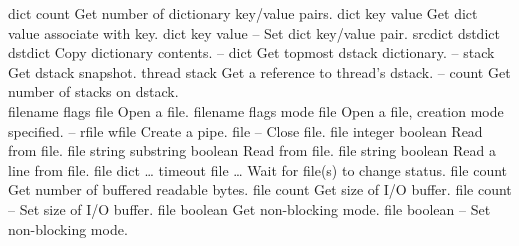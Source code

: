 \begin{longtable}{}
\hline
\optableent
	{dict}
	{{\bf {}}}
	{count}
	{Get number of dictionary key/value pairs.}
\hline
\optableent
	{dict key}
	{{\bf {}}}
	{value}
	{Get dict value associate with key.}
\hline
\optableent
	{dict key value}
	{{\bf {}}}
	{--}
	{Set dict key/value pair.}
\hline
\optableent
	{srcdict dstdict}
	{{\bf {}}}
	{dstdict}
	{Copy dictionary contents.}
\hline
\optableent
	{--}
	{{\bf {}}}
	{dict}
	{Get topmost dstack dictionary.}
\hline
\optableent
	{--}
	{{\bf {}}}
	{stack}
	{Get dstack snapshot.}
\hline
\optableent
	{thread}
	{{\bf {}}}
	{stack}
	{Get a reference to thread's dstack.}
\hline
\optableent
	{--}
	{{\bf {}}}
	{count}
	{Get number of stacks on dstack.}
\hline \hline
{} \\
\hline \hline
\optableent
	{filename flags}
	{{\bf {}}}
	{file}
	{Open a file.}
\optableent
	{filename flags mode}
	{{\bf {}}}
	{file}
	{Open a file, creation mode specified.}
\hline
\optableent
	{--}
	{{\bf {}}}
	{rfile wfile}
	{Create a pipe.}
\hline
\optableent
	{file}
	{{\bf {}}}
	{--}
	{Close file.}
\hline
\optableent
	{file}
	{{\bf {}}}
	{integer boolean}
	{Read from file.}
\optableent
	{file string}
	{{\bf {}}}
	{substring boolean}
	{Read from file.}
\optableent
	{file}
	{{\bf {}}}
	{string boolean}
	{Read a line from file.}
\hline
\optableent
	{{\lt}file dict \dots{\gt} timeout}
	{{\bf {}}}
	{{\lb}file \dots{\rb}}
	{Wait for file(s) to change status.}
\hline
\optableent
	{file}
	{{\bf {}}}
	{count}
	{Get number of buffered readable bytes.}
\hline
\optableent
	{file}
	{{\bf {}}}
	{count}
	{Get size of I/O buffer.}
\hline
\optableent
	{file count}
	{{\bf {}}}
	{--}
	{Set size of I/O buffer.}
\hline
\optableent
	{file}
	{{\bf {}}}
	{boolean}
	{Get non-blocking mode.}
\hline
\optableent
	{file boolean}
	{{\bf {}}}
	{--}
	{Set non-blocking mode.}
\hline
\optableent

\end{longtable}
